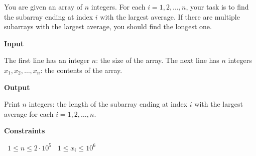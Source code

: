 You are given an array of $n$ integers. For each $i = 1, 2,\dots, n$, your task is to find the subarray ending at index $i$ with the largest average. If there are multiple subarrays with the largest average, you should find the longest one.

\vspace{0.3cm}\noindent\textbf{Input}

The first line has an integer $n$: the size of the array.
The next line has $n$ integers $x_1, x_2,\dots, x_n$: the contents of the array.

\vspace{0.3cm}\noindent\textbf{Output}

Print $n$ integers: the length of the subarray ending at index $i$ with the largest average for each $i = 1, 2,\dots, n$.

\vspace{0.3cm}\noindent\textbf{Constraints}

\textbullet\ $1 \le n \le 2 \cdot 10^5$
\textbullet\ $1 \le x_i \le 10^6$